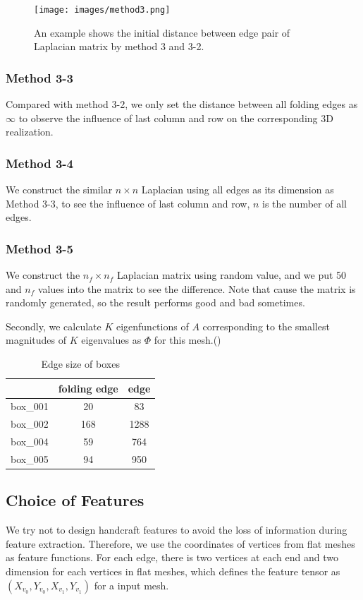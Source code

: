 \begin{figure}[ht]
	\centering
	\texttt{[image: images/method3.png]}
	\caption{An example shows the initial distance between edge pair of Laplacian matrix by method 3 and 3-2. }
	\label{fig:method}
\end{figure}

\subsubsection{Method 3-3}
Compared with method 3-2, we only set the distance between all folding edges as $\infty$ to observe the influence of last column and row on the corresponding 3D realization.

\subsubsection{Method 3-4}
We construct the similar $n \times n$ Laplacian using all edges as its dimension as Method 3-3, to see the influence of last column and row, $n$ is the number of all edges.

\subsubsection{Method 3-5}
We construct the $n_f \times n_f$ Laplacian matrix using random value, and we put 50 and $n_f$ values into the matrix to see the difference. Note that cause the matrix is randomly generated, so the result performs good and bad sometimes.

Secondly, we calculate $K$ eigenfunctions of $A$ corresponding to the smallest magnitudes of $K$ eigenvalues as $\Phi$ for this mesh.({\color{blue}{We now use ``scipy.sparse.linalg.eigs" in python to solve this problem. It seems that it is also use ``ARPACK" routines as backend the same as other solvers. We choose ``SM" mode to make the solver to choose eigenvalues with smallest magnitudes}})

\begin{table}[ht]
	\centering
	\begin{tabular}{|c|c|c|}
		\hline
		& folding edge & edge\\
		\hline
		box\_001 & 20 & 83\\
		\hline
		box\_002 & 168 & 1288\\
		\hline
		box\_004 & 59 & 764\\
		\hline
		box\_005 & 94 & 950\\
		\hline
	\end{tabular}
	\caption{Edge size of boxes}
\end{table}

\subsection{Choice of Features}
We try not to design handcraft features to avoid the loss of information during feature extraction. Therefore, we use the coordinates of vertices from flat meshes as feature functions. For each edge, there is two vertices at each end and two dimension for each vertices in flat meshes, which defines the feature tensor as $(X_{v_0},Y_{v_0},X_{v_1},Y_{v_1})$ for a input mesh.
